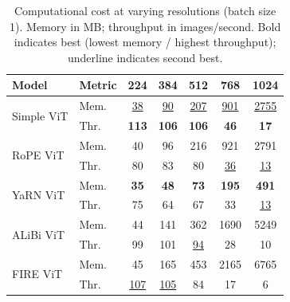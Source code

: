\begin{table}[t]
\centering
\caption{Computational cost at varying resolutions (batch size 1). Memory in MB; throughput in images/second. Bold indicates best (lowest memory / highest throughput); underline indicates second best.}
\label{tab:compute}
\small
\begin{tabular}{ll|ccccc}
\toprule
\textbf{Model} & \textbf{Metric} & \textbf{224} & \textbf{384} & \textbf{512} & \textbf{768} & \textbf{1024} \\
\midrule
\multirow{2}{*}{Simple ViT} & Mem. & \underline{38} & \underline{90} & \underline{207} & \underline{901} & \underline{2755} \\
                            & Thr. & \textbf{113} & \textbf{106} & \textbf{106} & \textbf{46} & \textbf{17} \\
\midrule
\multirow{2}{*}{RoPE ViT}   & Mem. & 40 & 96 & 216 & 921 & 2791 \\
                            & Thr. & 80 & 83 & 80 & \underline{36} & \underline{13} \\
\midrule
\multirow{2}{*}{YaRN ViT}   & Mem. & \textbf{35} & \textbf{48} & \textbf{73} & \textbf{195} & \textbf{491} \\
                            & Thr. & 75 & 64 & 67 & 33 & \underline{13} \\
\midrule
\multirow{2}{*}{ALiBi ViT}  & Mem. & 44 & 141 & 362 & 1690 & 5249 \\
                            & Thr. & 99 & 101 & \underline{94} & 28 & 10 \\
\midrule
\multirow{2}{*}{FIRE ViT}   & Mem. & 45 & 165 & 453 & 2165 & 6765 \\
                            & Thr. & \underline{107} & \underline{105} & 84 & 17 & 6 \\
\bottomrule
\end{tabular}
\end{table}